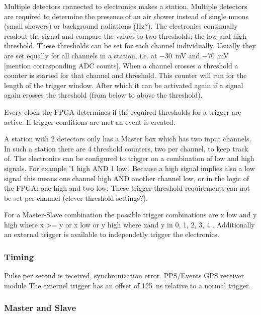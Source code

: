 Multiple detectors connected to \hisparc electronics makes a station. Multiple detectors are required to determine the presence of an air shower instead of single muons (small showers) or background radiations (Hz?). The \hisparc electronics continually readout the signal and compare the \adc values to two thresholds; the low and high threshold. These thresholds can be set for each channel individually. Usually they are set equally for all channels in a station, i.e. at \SI{-30}{\milli\volt} and \SI{-70}{\milli\volt} [mention corresponding ADC counts]. When a channel crosses a threshold a counter is started for that channel and threshold. This counter will run for the length of the trigger window. After which it can be activated again if a signal again crosses the threshold (from below to above the threshold).

Every clock the FPGA determines if the required thresholds for a trigger are active. If trigger conditions are met an event is created.

A station with 2 detectors only has a Master box which has two input channels. In such a station there are 4 threshold counters, two per channel, to keep track of. The electronics can be configured to trigger on a combination of low and high signals. For example '1 high AND 1 low'. Because a high signal implies also a low signal this means one channel high AND another channel low, or in the logic of the FPGA: one high and two low. These trigger threshold requirements can not be set per channel (clever threshold settings?).

For a Master-Slave combination the possible trigger combinations are x low and y high where x >= y or x low or y high where xand y in 0, 1, 2, 3, 4 . Additionally an external trigger is available to independetly trigger the electronics.

\subsubsection{Timing}

Pulse per second is received, synchronization error.
PPS/Events
GPS receiver module \cite{trimble}
The externel trigger has an offset of \SI{125}{\nano\second} relative to a normal trigger.


\subsubsection{Master and Slave}
\label{sub:masterslave}


